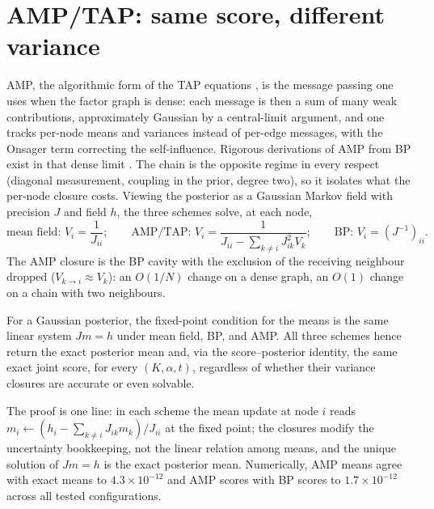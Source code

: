 \section{AMP/TAP: same score, different variance}\label{sec:bp-amp}

AMP, the algorithmic form of the TAP equations
\citep{thouless1977solution, donoho2009message, zdeborova2016statistical},
is the message passing one uses when the factor graph is dense: each
message is then a sum of many weak contributions, approximately Gaussian
by a central-limit argument, and one tracks per-node means and variances
instead of per-edge messages, with the Onsager term correcting the
self-influence. Rigorous derivations of AMP from BP exist in that dense
limit \citep{genovese2026amp}. The chain is the opposite regime in every
respect (diagonal measurement, coupling in the prior, degree two), so it
isolates what the per-node closure costs. Viewing the posterior as a
Gaussian Markov field with precision $J$ and field $h$, the three schemes
solve, at each node,
\begin{equation}
  \text{mean field: } V_i = \frac{1}{J_{ii}};
  \qquad
  \text{AMP/TAP: } V_i = \frac{1}{J_{ii} - \sum_{k \neq i} J_{ik}^2 V_k};
  \qquad
  \text{BP: } V_i = (J^{-1})_{ii} .
  \label{eq:bp-three-closures}
\end{equation}
The AMP closure is the BP cavity with the exclusion of the receiving
neighbour dropped ($V_{k \to i} \approx V_k$): an $O(1/N)$ change on a
dense graph, an $O(1)$ change on a chain with two neighbours.

\begin{theorem}\label{thm:bp-same-score}
For a Gaussian posterior, the fixed-point condition for the means is the
same linear system $J m = h$ under mean field, BP, and AMP. All three
schemes hence return the exact posterior mean and, via the
score--posterior identity, the same exact joint score, for every
$(K, \alpha, t)$, regardless of whether their variance closures are
accurate or even solvable.
\end{theorem}

The proof is one line: in each scheme the mean update at node $i$ reads
$m_i \leftarrow (h_i - \sum_{k \neq i} J_{ik} m_k)/J_{ii}$ at the fixed
point; the closures modify the uncertainty bookkeeping, not the linear
relation among means, and the unique solution of $Jm = h$ is the exact
posterior mean. Numerically, AMP means agree with exact means to
$4.3 \times 10^{-12}$ and AMP scores with BP scores to
$1.7 \times 10^{-12}$ across all tested configurations.


